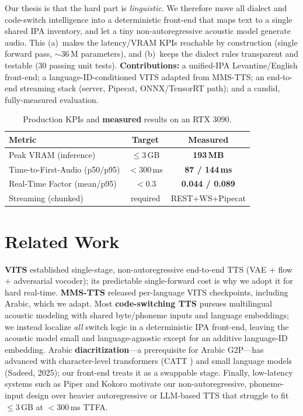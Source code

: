\documentclass[10pt,twocolumn]{article}
\begin{document}
Our thesis is that the hard part is \emph{linguistic}. We therefore move all dialect and
code-switch intelligence into a deterministic front-end that maps text to a single shared
IPA inventory, and let a tiny non-autoregressive acoustic model generate audio. This
(a)~makes the latency/VRAM KPIs reachable by construction (single forward pass,
${\sim}36$\,M parameters), and (b)~keeps the dialect rules transparent and testable
(30 passing unit tests). \textbf{Contributions:} a unified-IPA Levantine/English
front-end; a language-ID-conditioned VITS adapted from MMS-TTS; an end-to-end streaming
stack (server, Pipecat, ONNX/TensorRT path); and a candid, fully-measured evaluation.

\begin{table}[t]\centering\small
\caption{Production KPIs and \textbf{measured} results on an RTX 3090.}
\label{tab:kpi}
\begin{tabular}{@{}lcc@{}}
\toprule
Metric & Target & Measured \\
\midrule
Peak VRAM (inference) & $\leq 3$\,GB & \textbf{193\,MB} \;{\color{okgreen}\checkmark}\\
Time-to-First-Audio (p50/p95) & $<300$\,ms & \textbf{87 / 144\,ms} \;{\color{okgreen}\checkmark}\\
Real-Time Factor (mean/p95) & $<0.3$ & \textbf{0.044 / 0.089} \;{\color{okgreen}\checkmark}\\
Streaming (chunked) & required & REST+WS+Pipecat \;{\color{okgreen}\checkmark}\\
\bottomrule
\end{tabular}
\end{table}

\section{Related Work}
\textbf{VITS} \cite{kim2021} established single-stage, non-autoregressive end-to-end TTS
(VAE + flow + adversarial vocoder); its predictable single-forward cost is why we adopt
it for hard real-time. \textbf{MMS-TTS} \cite{pratap2023} released per-language VITS
checkpoints, including Arabic, which we adapt. Most \textbf{code-switching TTS} pursues
multilingual acoustic modeling with shared byte/phoneme inputs and language embeddings;
we instead localize \emph{all} switch logic in a deterministic IPA front-end, leaving the
acoustic model small and language-agnostic except for an additive language-ID embedding.
Arabic \textbf{diacritization}---a prerequisite for Arabic G2P---has advanced with
character-level transformers (CATT \cite{catt2024}) and small language models (Sadeed,
2025); our front-end treats it as a swappable stage. Finally, low-latency systems such as
Piper and Kokoro motivate our non-autoregressive, phoneme-input design over heavier
autoregressive or LLM-based TTS that struggle to fit ${\leq}3$\,GB at ${<}300$\,ms TTFA.
\end{document}
